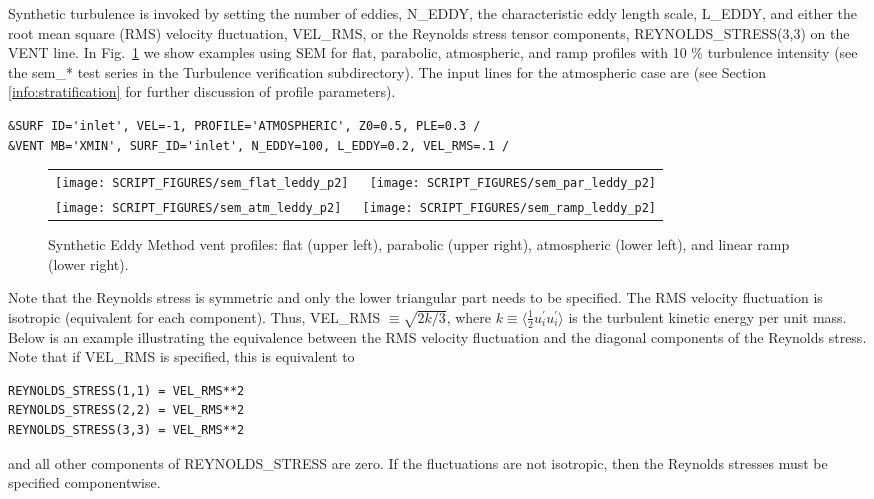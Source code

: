\documentclass[11pt]{book}
\begin{document}
Synthetic turbulence is invoked by setting the number of eddies, {\ct N\_EDDY}, the characteristic eddy length scale, {\ct L\_EDDY}, and either the root mean square (RMS)
velocity fluctuation, {\ct VEL\_RMS}, or the Reynolds stress tensor components, {\ct REYNOLDS\_STRESS(3,3)} on the {\ct VENT} line.  In Fig.~\ref{fig:sem_profiles} we show examples using SEM for flat, parabolic, atmospheric, and ramp profiles with 10 \% turbulence intensity (see the {\ct sem\_*} test series in the Turbulence verification subdirectory).  The input lines for the atmospheric case are (see Section \ref{info:stratification} for further discussion of profile parameters).
\begin{lstlisting}
&SURF ID='inlet', VEL=-1, PROFILE='ATMOSPHERIC', Z0=0.5, PLE=0.3 /
&VENT MB='XMIN', SURF_ID='inlet', N_EDDY=100, L_EDDY=0.2, VEL_RMS=.1 /
\end{lstlisting}

\begin{figure}[ht]
\begin{tabular*}{\textwidth}{lr}
\texttt{[image: SCRIPT\_FIGURES/sem\_flat\_leddy\_p2]} &
\texttt{[image: SCRIPT\_FIGURES/sem\_par\_leddy\_p2]} \\
\texttt{[image: SCRIPT\_FIGURES/sem\_atm\_leddy\_p2]} &
\texttt{[image: SCRIPT\_FIGURES/sem\_ramp\_leddy\_p2]}
\end{tabular*}
\caption[Synthetic Eddy Method vent profiles]{Synthetic Eddy Method vent profiles: flat (upper left), parabolic (upper right), atmospheric (lower left), and linear ramp (lower right).}
\label{fig:sem_profiles}
\end{figure}

Note that the Reynolds stress is symmetric and only the lower triangular part needs to be specified.  The RMS velocity fluctuation is isotropic (equivalent for each component). Thus, {\ct VEL\_RMS} $\equiv \sqrt{2k/3}$, where $k\equiv \langle\frac{1}{2}u_i^\prime u_i^\prime\rangle$ is the turbulent kinetic energy per unit mass. Below is an example illustrating the equivalence between the RMS velocity fluctuation and the diagonal components of the Reynolds stress. Note that if {\ct VEL\_RMS} is specified, this is equivalent to
\begin{lstlisting}
REYNOLDS_STRESS(1,1) = VEL_RMS**2
REYNOLDS_STRESS(2,2) = VEL_RMS**2
REYNOLDS_STRESS(3,3) = VEL_RMS**2
\end{lstlisting}
and all other components of {\ct REYNOLDS\_STRESS} are zero. If the fluctuations are not isotropic, then the Reynolds stresses must be specified componentwise.
\end{document}
